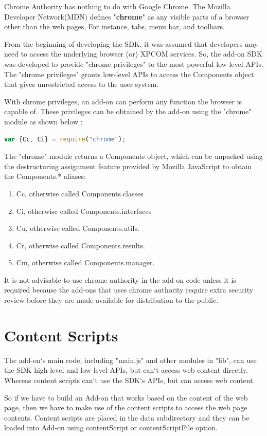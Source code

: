 Chrome Authority has nothing to do with Google Chrome. The Mozilla Developer Network(MDN) defines "\textbf{chrome}" as any visible parts of a browser other than the web pages, For instance, tabs, menu bar, and toolbars.

From the beginning of developing the SDK, it was assumed that developers may need to access the underlying browser (or) XPCOM services. So, the add-on SDK was developed to provide "chrome privileges" to the most powerful low level APIs. The "chrome privileges" grants low-level APIs to access the Components object that gives unrestricted access to the user system.  

With chrome privileges, an add-on can perform any function the browser is capable of. These privileges can be obtained by the add-on using the "chrome" module as shown below \cite{bib1}:
\begin{lstlisting}[frame=single,language=JavaScript,numbers=none,mathescape=false]
var {Cc, Ci} = require("chrome");
\end{lstlisting}
The "chrome" module returns a Components object, which can be unpacked using the destructuring assignment feature provided by Mozilla JavaScript to obtain the Components.* aliases: 
\begin{enumerate}
\item Cc, otherwise called Components.classes
\item Ci, otherwise called Components.interfaces
\item Cu, otherwise called Components.utils.
\item Cr, otherwise called Components.results.
\item Cm, otherwise called Components.manager.
\end{enumerate}
It is not advisable to use chrome authority in the add-on code unless it is required because the add-ons that uses chrome authority require extra security review before they are made available for distribution to the public.

\section{Content Scripts} \label{sec:contentscript}

The add-on`s main code, including "main.js" and other modules in "lib", can use the SDK high-level and low-level APIs, but can`t access web content directly. Whereas content scripts can`t use the SDK`s APIs, but can access web content.

So if we have to build an Add-on that works based on the content of the web page, then we have to make use of the content scripts to access the web page contents. Content scripts are placed in the data subdirectory and they can be loaded into Add-on using contentScript or contentScriptFile option.

